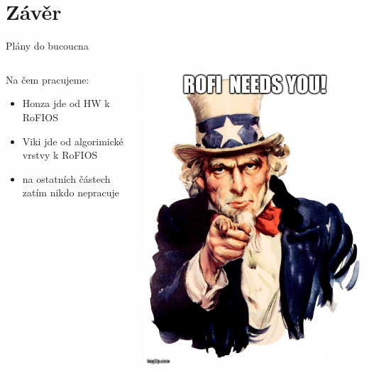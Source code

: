 \documentclass{beamer}
\begin{document}
\section{Závěr}

\begin{frame}{Plány do bucoucna}
    \begin{columns}
        \begin{column}{0.5\textwidth}
            Na čem pracujeme:
            \begin{itemize}
                \item Honza jde od HW k RoFIOS
                \item Viki jde od algorimické vrstvy k RoFIOS
                \item na ostatních částech zatím nikdo nepracuje
            \end{itemize}
        \end{column}
        \begin{column}{0.5\textwidth}
            \pause
            \includegraphics[width=\textwidth]{img/sam}
        \end{column}
    \end{columns}
\end{frame}
\end{document}
